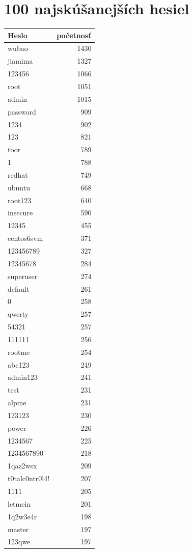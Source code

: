 \documentclass[12pt, oneside]{book}
\begin{document}
\newpage	
\thispagestyle{empty}
\section*{100 najskúšanejších hesiel}
\tiny
\begin{longtable}{|l|r|}
\hline
Heslo&početnosť\\
\hline
wubao&1430\\ 
jiamima&1327\\ 
123456&1066\\ 
root&1051\\ 
admin&1015\\ 
password&909\\ 
1234&902\\ 
123&821\\ 
toor&789\\ 
1&788\\ 
redhat&749\\ 
ubuntu&668\\ 
root123&640\\ 
insecure&590\\ 
12345&455\\ 
centos6svm&371\\ 
123456789&327\\ 
12345678&284\\ 
superuser&274\\ 
default&261\\ 
0&258\\ 
qwerty&257\\ 
54321&257\\ 
111111&256\\ 
rootme&254\\ 
abc123&249\\ 
admin123&241\\ 
test&231\\ 
alpine&231\\ 
123123&230\\ 
power&226\\ 
1234567&225\\ 
1234567890&218\\ 
1qaz2wsx&209\\ 
t0talc0ntr0l4!&207\\ 
1111&205\\ 
letmein&201\\ 
1q2w3e4r&198\\ 
master&197\\ 
123qwe&197\\ 

\end{longtable}
\end{document}
